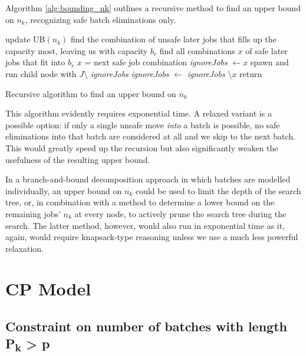 Algorithm \ref{alg:bounding_nk} outlines a recursive method to find an upper
bound on $n_k$, recognizing safe batch eliminations only.

\begin{algorithm}[h]
\fontsize{9pt}{11.5pt}\selectfont
\begin{algorithmic}
 
  \State update UB$(n_k)$
\EndIf
\State find the combination of unsafe later jobs that fills up the capacity
most, leaving us with capacity $b_r$ 
\State find all combinations $x$ of safe later jobs that fit into $b_r$
\Repeat
  \State $x$ = next safe job combination
  \State \textit{ignoreJobs} $\gets x$ 
  \State spawn and run child node with $J \setminus$ \textit{ignoreJobs}
  \State \textit{ignoreJobs} $\gets$ \textit{ignoreJobs} $\setminus x$
\State return
\end{algorithmic}
\caption{Recursive algorithm to find an upper bound on $n_k$}
\label{alg:bounding_nk}
\end{algorithm}

This algorithm evidently requires exponential time. A relaxed variant is a
possible option: if only a single unsafe move \textit{into} a batch is possible,
no safe eliminations into that batch are considered at all and we skip to the
next batch. This would greatly speed up the recursion but also significantly
weaken the usefulness of the resulting upper bound.

In a branch-and-bound decomposition approach in which batches are modelled
individually, an upper bound on $n_k$ could be used to limit the depth of the
search tree, or, in combination with a method to determine a lower bound on the
remaining jobs' $n_k$ at every node, to actively prune the search tree during
the search. The latter method, however, would also run in exponential time as
it, again, would require knapsack-type reasoning unless we use a much less powerful
relaxation.

\section{CP Model}
\subsection[Constraint on the number of batches with length $P_k >
p$]{Constraint on number of batches with length {\sansitalicfont
P\textsubscript{k}} > {\sansitalicfont p}}

